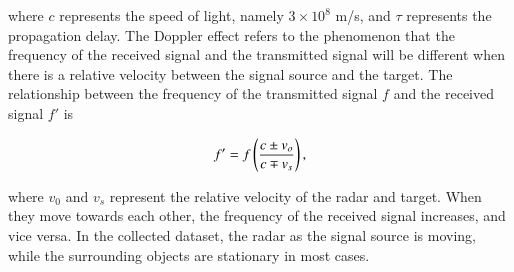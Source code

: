 where $c$ represents the speed of light, namely $3 \times 10^8$ m/s, and $\tau$ represents the propagation delay. The Doppler effect refers to the phenomenon that the frequency of the received signal and the transmitted signal will be different when there is a relative velocity between the signal source and the target. The relationship between the frequency of the transmitted signal $f$ and the received signal $f'$ is

\begin{equation}
    \centering
    f' = f \left( \frac{c \pm v_o}{c \mp v_s} \right),
    \label{doppler shift formula}
\end{equation}

where $v_0$ and $v_s$ represent the relative velocity of the radar and target. When they move towards each other, the frequency of the received signal increases, and vice versa. In the collected dataset, the radar as the signal source is moving, while the surrounding objects are stationary in most cases.


